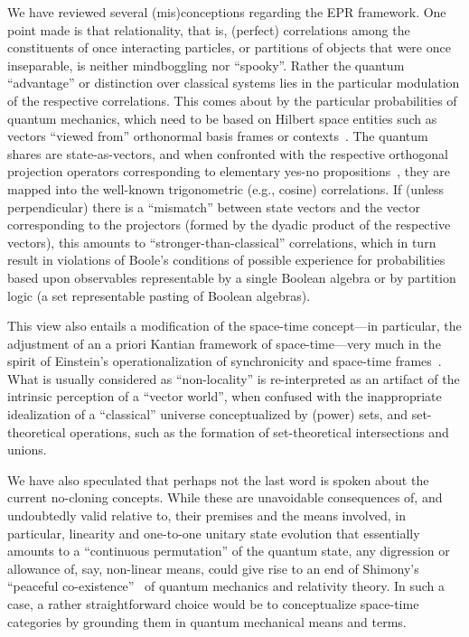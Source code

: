 \documentclass[entropy,article,accept,oneauthor,pdftex]{Definitions/mdpi}
\begin{document}
We have reviewed several (mis)conceptions regarding the EPR framework.
One point made is that relationality, that is, (perfect) correlations among the constituents of once interacting particles,
or partitions of objects that were once inseparable, is neither mindboggling nor ``spooky''.
Rather the quantum ``advantage'' or distinction over classical systems lies in the particular modulation of the respective correlations.
This comes about by the particular probabilities of quantum mechanics, which need to be based on Hilbert space entities such as vectors
``viewed from'' orthonormal basis frames or contexts~\cite{Gleason}.
The quantum shares are state-as-vectors, and when confronted with the respective orthogonal projection operators
corresponding to elementary yes-no propositions~\cite{birkhoff-36},
they %
 are mapped into the well-known trigonometric (e.g., cosine) correlations.
If (unless perpendicular) there is a ``mismatch'' between state vectors and the vector corresponding to the projectors
(formed by the dyadic product of the respective vectors), this
amounts to ``stronger-than-classical'' correlations, which in turn result in violations of Boole's conditions of possible experience for probabilities based
upon observables representable by a single Boolean algebra or by partition logic (a set representable pasting of Boolean algebras).

This view also entails a modification of the space-time concept---in particular, the adjustment of an a priori Kantian framework of space-time---very much in the spirit of Einstein's operationalization of synchronicity and space-time frames~\cite{ein-05}.
What is usually considered as ``non-locality'' is re-interpreted as an artifact of the intrinsic perception of a ``vector world'',
when confused with the inappropriate idealization of a ``classical'' universe conceptualized by (power) sets, and set-theoretical operations, such as the
formation of set-theoretical intersections and unions.

We have also speculated that perhaps not the last word is spoken about the current no-cloning concepts.
While these are unavoidable consequences of, and undoubtedly valid relative to, their premises and the means involved, in particular,
linearity and one-to-one unitary state evolution that essentially amounts to a ``continuous permutation''
of the quantum state, any digression or allowance of, say, non-linear means, could give rise to an end of Shimony's ``peaceful co-existence''~\cite{shimony2,shimony3}
of quantum mechanics and relativity theory.
In such a case, a rather straightforward choice would be to conceptualize space-time categories by grounding them in quantum mechanical means and terms.
\end{document}
